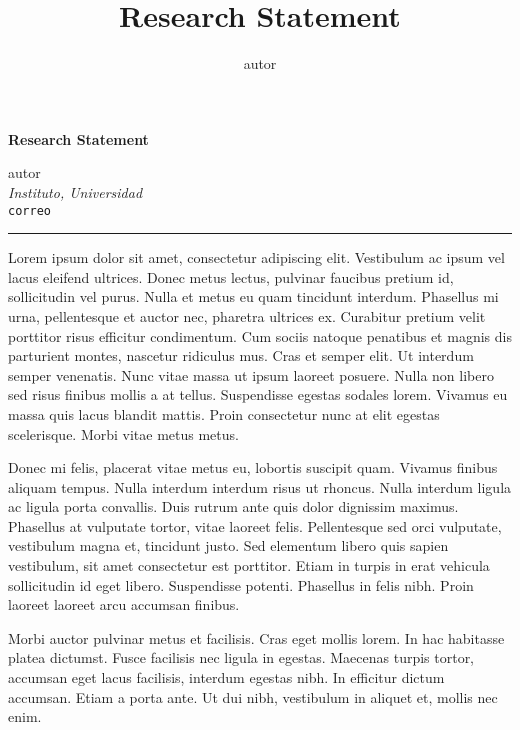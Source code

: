 \documentclass[11pt,]{article}
\title{Research Statement}
\author{autor}
\date{}
\newcommand{\blankline}{\quad\pagebreak[2]}
\begin{document}
  



\thispagestyle{plain} 

\begin{flushleft}\Large \bf Research Statement  \end{flushleft}
	\vspace{1 mm}   
autor \\
\emph{Instituto, Universidad} \\
\texttt{correo}   \\

  

\hrule

\vspace{6 mm}
	


Lorem ipsum dolor sit amet, consectetur adipiscing elit. Vestibulum ac
ipsum vel lacus eleifend ultrices. Donec metus lectus, pulvinar faucibus
pretium id, sollicitudin vel purus. Nulla et metus eu quam tincidunt
interdum. Phasellus mi urna, pellentesque et auctor nec, pharetra
ultrices ex. Curabitur pretium velit porttitor risus efficitur
condimentum. Cum sociis natoque penatibus et magnis dis parturient
montes, nascetur ridiculus mus. Cras et semper elit. Ut interdum semper
venenatis. Nunc vitae massa ut ipsum laoreet posuere. Nulla non libero
sed risus finibus mollis a at tellus. Suspendisse egestas sodales lorem.
Vivamus eu massa quis lacus blandit mattis. Proin consectetur nunc at
elit egestas scelerisque. Morbi vitae metus metus.

Donec mi felis, placerat vitae metus eu, lobortis suscipit quam. Vivamus
finibus aliquam tempus. Nulla interdum interdum risus ut rhoncus. Nulla
interdum ligula ac ligula porta convallis. Duis rutrum ante quis dolor
dignissim maximus. Phasellus at vulputate tortor, vitae laoreet felis.
Pellentesque sed orci vulputate, vestibulum magna et, tincidunt justo.
Sed elementum libero quis sapien vestibulum, sit amet consectetur est
porttitor. Etiam in turpis in erat vehicula sollicitudin id eget libero.
Suspendisse potenti. Phasellus in felis nibh. Proin laoreet laoreet arcu
accumsan finibus.

Morbi auctor pulvinar metus et facilisis. Cras eget mollis lorem. In hac
habitasse platea dictumst. Fusce facilisis nec ligula in egestas.
Maecenas turpis tortor, accumsan eget lacus facilisis, interdum egestas
nibh. In efficitur dictum accumsan. Etiam a porta ante. Ut dui nibh,
vestibulum in aliquet et, mollis nec enim.
\end{document}
